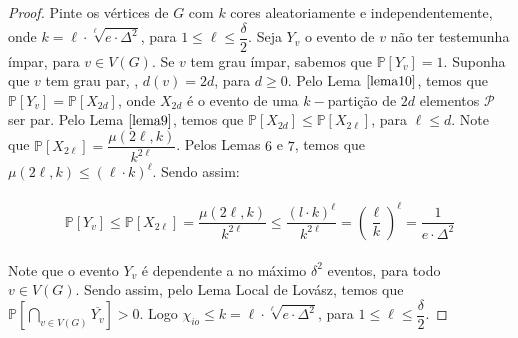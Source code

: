 \documentclass[12pt]{article}
\begin{document}
  \begin{proof}
  	Pinte os vértices de $G$ com $k$ cores aleatoriamente e independentemente, onde $k = \ell \cdot \sqrt[\ell]{e \cdot \Delta^2}$, para $1 \leq \ell \leq \dfrac{\delta}{2}$. Seja $Y_{v}$ o evento de $v$ não ter testemunha ímpar, para $v \in V(G)$. Se $v$ tem grau ímpar, sabemos que $\mathds{P}[Y_v] = 1$. Suponha que $v$ tem grau par, \ie, $d(v) = 2d$, para $d \geq 0$. Pelo Lema $\ref{lema10}$, temos que $\mathds{P}[Y_v] = \mathds{P}[X_{2d}]$, onde $X_{2d}$ é o evento de uma $k-$partição de $2d$ elementos $\mathcal{P}$ ser par. Pelo Lema $\ref{lema9}$, temos que $\mathds{P}[X_{2d}] \leq \mathds{P}[X_{2\ell}]$, para $\ell \leq d$. Note que $\mathds{P}[X_{2\ell}] =\dfrac{\mu(2\ell, k)}{k^{2\ell}} $. Pelos Lemas $6$ e $7$, temos que $\mu(2\ell, k) \leq (\ell \cdot k)^\ell$. Sendo assim: 
  	
  	\begin{align}
  		\begin{split}
  			\mathds{P}[Y_{v}] \leq \mathds{P}[X_{2\ell}] = \dfrac{\mu(2\ell, k)}{k^{2\ell}} \leq  \dfrac{(l \cdot k)^\ell}{k^{2\ell}} = \left(\dfrac{\ell}{k}\right)^\ell = \dfrac{1}{e \cdot \Delta^2}
  		\end{split} 
  	\end{align}
  	
  	Note que o evento $Y_v$ é dependente a no máximo $\delta^2$ eventos, para todo $v \in V(G)$. Sendo assim, pelo Lema Local de Lovász, temos que $\mathds{P}[\bigcap\limits_{v \in V(G)} \overline{Y_{v}} ] > 0$. Logo $\chi_{io} \leq k = \ell \cdot \sqrt[\ell]{e \cdot \Delta^2}$, para $1 \leq \ell \leq \dfrac{\delta}{2}$.
  	
  \end{proof}
\end{document}
